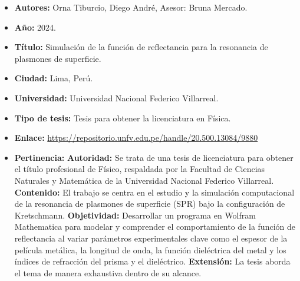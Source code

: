 \begin{itemize}
  \item \textbf{Autores:} Orna Tiburcio, Diego André, Asesor: Bruna Mercado.
  \item \textbf{Año:} 2024.
  \item \textbf{Título:} Simulación de la función de reflectancia para la resonancia de plasmones de superficie.
  \item \textbf{Ciudad:} Lima, Perú.
  \item \textbf{Universidad:} Universidad Nacional Federico Villarreal.
  \item \textbf{Tipo de tesis:} Tesis para obtener la licenciatura en Física.
  \item \textbf{Enlace:} \url{https://repositorio.unfv.edu.pe/handle/20.500.13084/9880}
  \item \textbf{Pertinencia:}
  \subitem \textbf{Autoridad:} Se trata de una tesis de licenciatura para obtener el título profesional de Físico, respaldada por la Facultad de Ciencias Naturales y Matemática de la Universidad Nacional Federico Villarreal.
  \subitem \textbf{Contenido:} El trabajo se centra en el estudio y la simulación computacional de la resonancia de plasmones de superficie (SPR) bajo la configuración de Kretschmann.
  \subitem \textbf{Objetividad:} Desarrollar un programa en Wolfram Mathematica para modelar y comprender el comportamiento de la función de reflectancia al variar parámetros experimentales clave como el espesor de la película metálica, la longitud de onda, la función dieléctrica del metal y los índices de refracción del prisma y el dieléctrico.
  \subitem \textbf{Extensión:} La tesis aborda el tema de manera exhaustiva dentro de su alcance.
\end{itemize}

